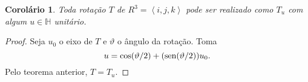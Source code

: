 \documentclass[12pt]{amsart}
\newcommand{\Ha}{\mathbb H}
\DeclareMathOperator{\sen}{\textrm{\rm sen}}
\newtheorem{corollary}[theorem]{Corolário}
\theoremstyle{definition}
\begin{document}
\begin{corollary}
    Toda rotação $T$ de $R^3=\left<i,j,k\right>$ pode ser realizado como $T_u$ com algum $u\in\Ha$ unitário. 
\end{corollary}
\begin{proof}
    Seja $u_0$ o eixo de $T$ e $\vartheta$ o ângulo da rotação. Toma 
    \[
        u=\cos(\vartheta/2)+(\sen(\vartheta/2))u_0.
    \] 
    Pelo teorema anterior, $T=T_{u}$.
\end{proof}
\end{document}

